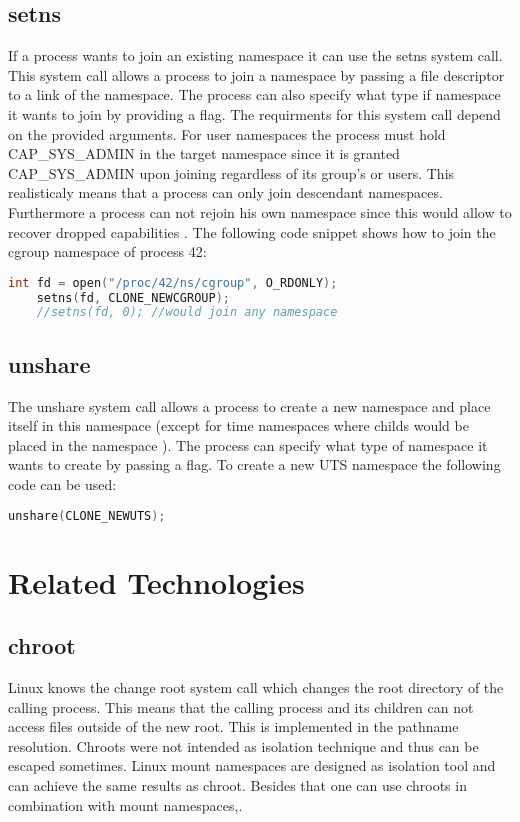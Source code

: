 \documentclass[10pt,twocolumn,a4paper]{article}
\begin{document}
\subsection{ setns}
If a process wants to join an existing namespace it can use the setns system call. This system call
allows a process to join a namespace by passing a file descriptor to a link of the namespace. The
process can also specify what type if namespace it wants to join by providing a flag. The
requirments for this system call depend on the provided arguments. For user namespaces the process
must hold CAP\_SYS\_ADMIN in the target namespace since it is granted CAP\_SYS\_ADMIN upon joining
regardless of its group's or users. This realisticaly means that a process can only
join descendant namespaces. Furthermore a process can not rejoin his own namespace since this would
allow to recover dropped capabilities \cite{23}. The following code snippet shows how to join the
cgroup namespace of process 42:
\begin{lstlisting}[language=C]
    int fd = open("/proc/42/ns/cgroup", O_RDONLY);
    setns(fd, CLONE_NEWCGROUP);
    //setns(fd, 0); //would join any namespace
\end{lstlisting}


\subsection{ unshare}
The unshare system call allows a process to create a new namespace and place itself in this
namespace (except for  time namespaces where childs would be placed in the namespace \cite{15}). 
The process can specify what type of namespace it wants to create by passing a flag. To create a new
UTS namespace the following code can be used:
\begin{lstlisting}[language=C]
    unshare(CLONE_NEWUTS);
\end{lstlisting}\cite{24}
\section{Related Technologies}\label{sec:related}
\subsection{chroot}
Linux knows the change root system call which changes the root directory of the calling
process. This means that the calling process and its children can not access files outside of the
new root. This is implemented in the pathname resolution\cite{1}. Chroots were not intended as
isolation technique and thus can be escaped sometimes. Linux mount namespaces are
designed as isolation tool and can achieve the same results as chroot. Besides that one can use
chroots in combination with mount namespaces\cite{1},\cite{25}. 
\end{document}
